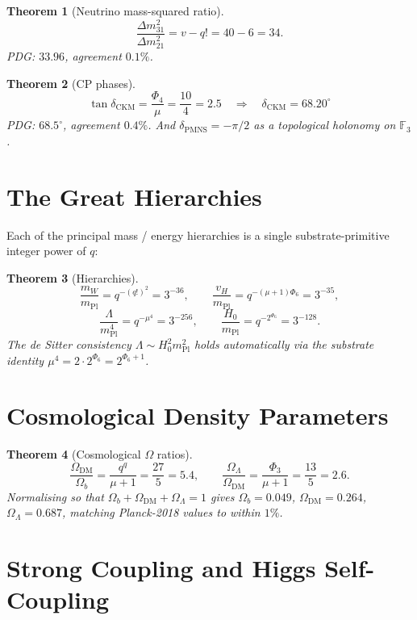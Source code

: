 \documentclass[11pt]{article}
\newtheorem{theorem}{Theorem}
\newcommand{\GF}[1]{\mathbb{F}_{#1}}
\newcommand{\mPl}{m_{\mathrm{Pl}}}
\begin{document}
\begin{theorem}[Neutrino mass-squared ratio]\label{thm:nu_ratio}
\[
  \frac{\Delta m^2_{31}}{\Delta m^2_{21}} = v - q! = 40 - 6 = 34.
\]
PDG: $33.96$, agreement $0.1\%$.
\end{theorem}

\begin{theorem}[CP phases]\label{thm:cp}
\[
  \tan\delta_{\mathrm{CKM}} = \frac{\Phi_4}{\mu} = \frac{10}{4} = 2.5
  \quad \Longrightarrow \quad
  \delta_{\mathrm{CKM}} = 68.20^\circ
\]
PDG: $68.5^\circ$, agreement $0.4\%$.  And $\delta_{\mathrm{PMNS}} = -\pi/2$
as a topological holonomy on $\GF{3}$.
\end{theorem}

\section{The Great Hierarchies}

Each of the principal mass / energy hierarchies is a single
substrate-primitive integer power of $q$:

\begin{theorem}[Hierarchies]\label{thm:hierarchies}
\[
  \frac{m_W}{\mPl} = q^{-(q!)^2} = 3^{-36}, \qquad
  \frac{v_H}{\mPl} = q^{-(\mu+1)\Phi_6} = 3^{-35},
\]
\[
  \frac{\Lambda}{\mPl^4} = q^{-\mu^4} = 3^{-256}, \qquad
  \frac{H_0}{\mPl} = q^{-2^{\Phi_6}} = 3^{-128}.
\]
The de Sitter consistency $\Lambda \sim H_0^2 \mPl^2$ holds automatically
via the substrate identity $\mu^4 = 2 \cdot 2^{\Phi_6} = 2^{\Phi_6+1}$.
\end{theorem}

\section{Cosmological Density Parameters}

\begin{theorem}[Cosmological $\Omega$ ratios]\label{thm:omegas}
\[
  \frac{\Omega_{\mathrm{DM}}}{\Omega_b} = \frac{q^q}{\mu+1} = \frac{27}{5} = 5.4,
\qquad
  \frac{\Omega_\Lambda}{\Omega_{\mathrm{DM}}} = \frac{\Phi_3}{\mu+1} = \frac{13}{5} = 2.6.
\]
Normalising so that $\Omega_b + \Omega_{\mathrm{DM}} + \Omega_\Lambda = 1$
gives $\Omega_b = 0.049$, $\Omega_{\mathrm{DM}} = 0.264$,
$\Omega_\Lambda = 0.687$, matching Planck-2018 values to within $1\%$.
\end{theorem}

\section{Strong Coupling and Higgs Self-Coupling}
\end{document}
